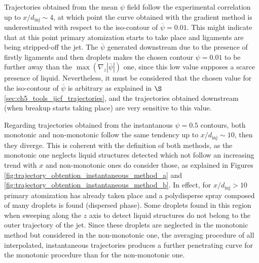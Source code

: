 Trajectories obtained from the mean $\psi$ field follow the experimental correlation up to $x/d_\mathrm{inj} \sim 4$, at which point the curve obtained with the gradient method is underestimated with respect to the iso-contour of $\overline{\psi} = 0.01$. This might indicate that at this point primary atomization starts to take place and ligaments are being stripped-off the jet. The $\overline{\psi}$ generated downstream due to the presence of firstly ligaments and then droplets makes the chosen contour $\psi = 0.01$ to be further away than the $\max \left( \nabla_z | \overline{\psi} | \right)$ one, since this low value supposes a scarce presence of liquid. Nevertheless, it must be considered that the chosen value for the iso-contour of $\overline{\psi}$ is arbitrary as explained in $\S$\ref{sec:ch5_tools_jicf_trajectories}, and the trajectories obtained downstream (when breakup starts taking place) are very sensitive to this value.

Regarding trajectories obtained from the instantanous $\psi = 0.5$ contours, both monotonic and non-monotonic follow the same tendency up to $x/d_\mathrm{inj} \sim 10$, then they diverge. This is coherent with the definition of both methods, as the monotonic one neglects liquid structures detected which not follow an increasing trend with $x$ and non-monotonic ones do consider those, as explained in Figures \ref{fig:trajectory_obtention_instantaneous_method_a} and \ref{fig:trajectory_obtention_instantaneous_method_b}. In effect, for $x/d_\mathrm{inj} > 10$ primary atomization has already taken place and a polydisperse spray composed of many droplets is found (dispersed phase). Some droplets found in this region when sweeping along the $z$ axis to detect liquid structures do not belong to the outer trajectory of the jet. Since these droplets are neglected in the monotonic method but considered in the non-monotonic one, the averaging procedure of all interpolated, instantaneous trajectories produces a further penetrating curve for the monotonic procedure than for the non-monotonic one.

